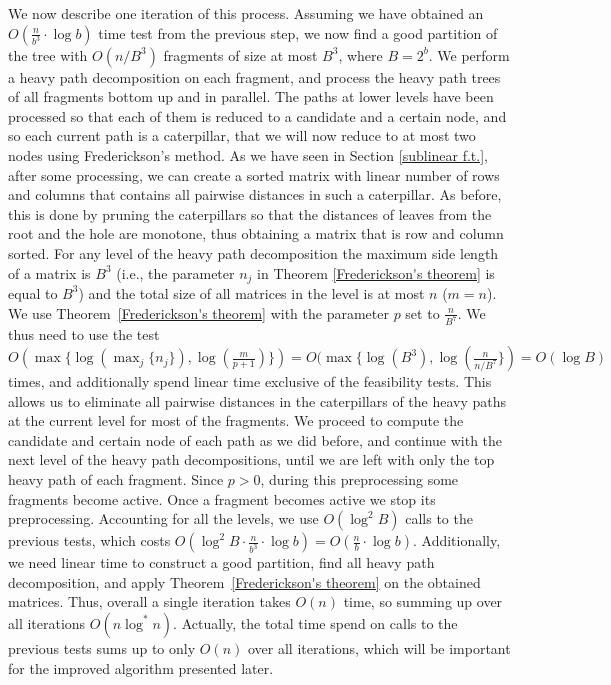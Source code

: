 \documentclass[a4paper,UKenglish]{lipics-v2016}
\theoremstyle{plain}
\begin{document}
We now describe one iteration of this process. Assuming we have obtained an $O(\frac{n}{b^3} \cdot \log b)$ time 
test from the previous step, we now find a good partition of the tree with $O(n/B^{3})$ fragments of size at most $B^3$, 
where $B=2^b$. We perform a heavy path decomposition on each fragment, and process the heavy
path trees of all fragments bottom up and in parallel. The paths at lower levels have been processed so that each of them is
reduced to a candidate and a certain node, and so each current path is a caterpillar, that we will now reduce to at most two nodes using Frederickson's method. As we have seen in Section \ref{sublinear f.t.}, after some processing, we can create a sorted matrix 
with linear number of rows and columns that contains all pairwise distances in such a caterpillar. As before, this is done by pruning the caterpillars so that the distances of leaves from the root and the hole are monotone, thus obtaining a matrix that is row and column sorted. For any level of the heavy path decomposition the maximum side length of a matrix is $B^{3}$ (i.e., the parameter $n_j$ in Theorem \ref{Frederickson's theorem} is equal to $B^3$) and the total size of all matrices in the level is at most $n$ ($m=n$).
We use Theorem~\ref{Frederickson's theorem} with the parameter $p$ set to $\frac{n}{B^7}$. We thus need to use the
test $O(\max \lbrace \log(\max_{j} \lbrace n_j \rbrace), \log(\frac{m}{p+1}) \rbrace) = O(\max \lbrace \log (B^{3}), \log(\frac{n}{n/B^{7}} \rbrace) = O(\log B)$ times, and additionally spend linear time exclusive of the feasibility tests. This allows us to eliminate all pairwise distances in the caterpillars of the heavy paths at the current level for most of the fragments. We proceed to compute the candidate and certain node of each path as we did before, and continue with the next level
of the heavy path decompositions, until we are left with only the top heavy path of each fragment.
Since $p>0$, during this preprocessing some fragments become active. Once a fragment becomes active we stop
its preprocessing. Accounting for all the levels, we use $O(\log^{2}B)$ calls to the previous tests,
which costs $O(\log ^2B \cdot \frac{n}{b^3} \cdot \log b)=O(\frac{n}{b} \cdot \log b)$.
Additionally, we need linear time to construct a good partition, find all heavy path decomposition,
and apply Theorem~\ref{Frederickson's theorem} on the obtained matrices. Thus, overall
a single iteration takes $O(n)$ time, so summing up over all iterations $O(n\log^{*}n)$.
Actually, the total time spend on calls to the previous tests sums up to only $O(n)$ over all iterations, which will
be important for the improved algorithm presented later.
\end{document}

